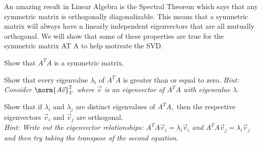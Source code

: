 


An amazing result in Linear Algebra is the Spectral Theorem which says that any symmetric matrix is orthogonally diagonalizable.
This means that a symmetric matrix will always have n linearly independent eigenvectors that are all mutually orthogonal.
We will show that some of these properties are true for the symmetric matrix AT A to help motivate the SVD.

\begin{enumerate}
  \qitem Show that $A^{T}A$ is a symmetric matrix.

  \ws{
  \vspace{150px}
  }


  \qitem Show that every eigenvalue $\lambda_{i}$ of $A^{T}A$ is greater than or equal to zero. \vskip 1pt
  \textit{Hint: Consider $\norm{A\vec{v}}_{2}^{2}.$ where $\vec{v}$ is an eigenvector of $A^{T}A$ with eigenvalue $\lambda.$}

  \ws{
  \vspace{150px}
  }


  \qitem Show that if $\lambda_{i}$ and $\lambda_{j}$ are distinct eigenvalues of $A^{T} A,$ then the respective eigenvectors $\vec{v}_{i}$ and $\vec{v}_{j}$ are orthogonal. \\
  \textit{Hint: Write out the eigenvector relationships: $A^{T} A \vec{v}_{i} = \lambda_{i} \vec{v}_{i}$ and $A^{T} A \vec{v}_{j} = \lambda_{i} \vec{v}_{j}$ and then try taking the transpose of the second equation.}


\end{enumerate}
